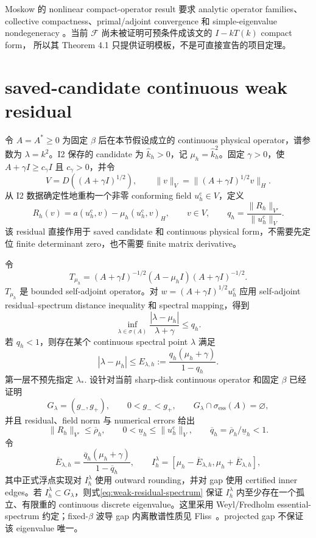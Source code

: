 \documentclass[UTF8,fontset=fandol,11pt,a4paper]{ctexart}
\newcommand{\cF}{\mathcal F}
\begin{document}
Moskow 的 nonlinear compact-operator result 要求 analytic operator families、collective
compactness、primal/adjoint convergence 和 simple-eigenvalue nondegeneracy
\cite{Moskow2015}。当前 $\cF$ 尚未被证明可预条件成该文的 $I-kT(k)$ compact form，
所以其 Theorem 4.1 只提供证明模板，不是可直接宣告的项目定理。

\section{saved-candidate continuous weak residual}

令 $A=A^*\ge0$ 为固定 $\beta$ 后在本节假设成立的 continuous physical operator，谱参数为
$\lambda=k^2$。I2 保存的 candidate 为 $\widehat k_h>0$，记
$\mu_h=\widehat k_h^2$。固定 $\gamma>0$，使
$A+\gamma I\ge c_\gamma I$ 且 $c_\gamma>0$，并令
\[
  V=D((A+\gamma I)^{1/2}),
  \qquad
  \|v\|_V=\|(A+\gamma I)^{1/2}v\|_H.
\]
从 I2 数据确定性地重构一个非零 conforming field $u_h^{\mathrm c}\in V$，定义
\begin{equation}
  R_h(v)=a(u_h^{\mathrm c},v)-\mu_h(u_h^{\mathrm c},v)_H,
  \qquad v\in V,
  \qquad
  q_h=\frac{\|R_h\|_{V'}}{\|u_h^{\mathrm c}\|_V}.
  \label{eq:continuous-weak-residual}
\end{equation}
该 residual 直接作用于 saved candidate 和 continuous physical form，不需要先定位 finite
determinant zero，也不需要 finite matrix derivative。

令
\[
  T_{\mu_h}
  =(A+\gamma I)^{-1/2}(A-\mu_h I)(A+\gamma I)^{-1/2}.
\]
$T_{\mu_h}$ 是 bounded self-adjoint operator。对
$w=(A+\gamma I)^{1/2}u_h^{\mathrm c}$ 应用 self-adjoint residual--spectrum distance
inequality 和 spectral mapping，得到
\begin{equation}
  \inf_{\lambda\in\sigma(A)}
  \frac{|\lambda-\mu_h|}{\lambda+\gamma}
  \le q_h.
  \label{eq:weak-residual-spectrum}
\end{equation}
若 $q_h<1$，则存在某个 continuous spectral point $\lambda$ 满足
\begin{equation}
  |\lambda-\mu_h|
  \le E_{\lambda,h}
  :=\frac{q_h(\mu_h+\gamma)}{1-q_h}.
  \label{eq:weak-residual-lambda}
\end{equation}
第一层不预先指定 $\lambda_*$. 设针对当前 sharp-disk continuous operator 和固定 $\beta$
已经证明
\[
  G_\lambda=(g_-,g_+),
  \qquad 0<g_-<g_+,
  \qquad
  G_\lambda\cap\sigma_{\mathrm{ess}}(A)=\varnothing,
\]
并且 residual、field norm 与 numerical errors 给出
\[
  \|R_h\|_{V'}\le\overline\rho_h,
  \qquad
  0<\underline u_h\le\|u_h^{\mathrm c}\|_V,
  \qquad
  \overline q_h=\overline\rho_h/\underline u_h<1.
\]
令
\[
  \overline E_{\lambda,h}
  =\frac{\overline q_h(\mu_h+\gamma)}{1-\overline q_h},
  \qquad
  I_h^\lambda=
  [\mu_h-\overline E_{\lambda,h},
   \mu_h+\overline E_{\lambda,h}],
\]
其中正式浮点实现对 $I_h^\lambda$ 使用 outward rounding，并对 gap 使用 certified inner
edges。若 $I_h^\lambda\subset G_\lambda$，则式\eqref{eq:weak-residual-spectrum} 保证
$I_h^\lambda$ 内至少存在一个孤立、有限重的 continuous discrete eigenvalue。这里采用
Weyl/Fredholm essential-spectrum 约定；fixed-$\beta$ 波导 gap 内离散谱性质见
Fliss~\cite[Proposition~3.3]{Fliss2013}。projected gap 不保证该 eigenvalue 唯一。
\end{document}
